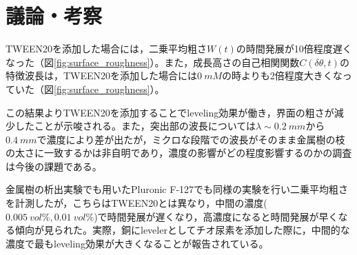 \documentclass[autodetect-engine,dvi=dvipdfmx,a4paper,ja=standard,oneside,openany,11pt,draft]{bxjsbook}
\begin{document}
\section{議論・考察}
TWEEN20を添加した場合には，二乗平均粗さ$W(t)$の時間発展が10倍程度遅くなった（図\ref{fig:surface_roughness}）。また，成長高さの自己相関関数$C(\delta\theta,t)$の特徴波長は，TWEEN20を添加した場合には$\SI{0}{mM}$の時よりも2倍程度大きくなっていた（図\ref{fig:surface_roughness}）。

この結果よりTWEEN20を添加することでleveling効果が働き，界面の粗さが減少したことが示唆される。また，突出部の波長については$\lambda\sim\SI{0.2}{mm}$から$\SI{0.4}{mm}$で濃度により差が出たが，ミクロな段階での波長がそのまま金属樹の枝の太さに一致するかは非自明であり，濃度の影響がどの程度影響するのかの調査は今後の課題である。

金属樹の析出実験でも用いたPluronic F-127でも同様の実験を行い二乗平均粗さを計測したが，こちらはTWEEN20とは異なり，中間の濃度($\SI{0.005}{vol\%},\SI{0.01}{vol\%}$)で時間発展が遅くなり，高濃度になると時間発展が早くなる傾向が見られた。実際，銅にlevelerとしてチオ尿素を添加した際に，中間的な濃度で最もleveling効果が大きくなることが報告されている\cite{schilardi2000stable}。

\ifdraft{
  
  
}{}
\end{document}
